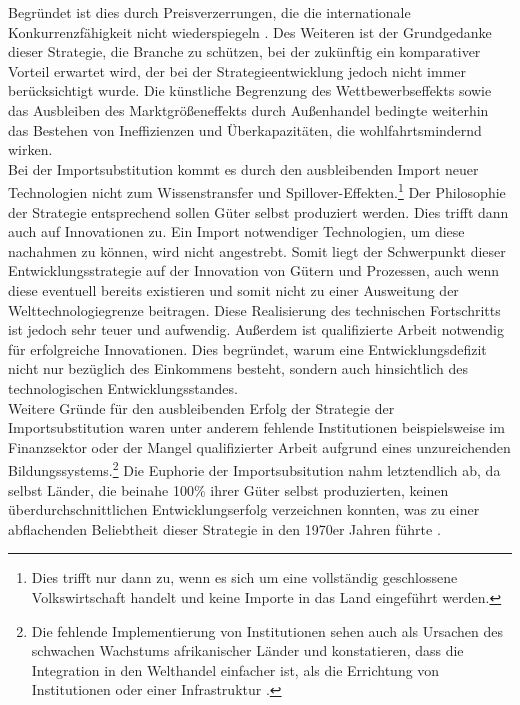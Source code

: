 Begr{\"u}ndet ist dies durch Preisverzerrungen, die die internationale Konkurrenzf{\"a}higkeit nicht wiederspiegeln \citep{Lachmann.1994}. Des Weiteren ist der Grundgedanke dieser Strategie, die Branche zu sch{\"u}tzen, bei der zuk{\"u}nftig ein komparativer Vorteil erwartet wird, der bei der Strategieentwicklung jedoch nicht immer ber{\"u}cksichtigt wurde. Die k{\"u}nstliche Begrenzung des Wettbewerbseffekts sowie das Ausbleiben des Marktgr{\"o}{\ss}eneffekts durch Au{\ss}enhandel bedingte weiterhin das Bestehen von Ineffizienzen und {\"U}berkapazit{\"a}ten, die wohlfahrtsmindernd wirken. \\
Bei der Importsubstitution kommt es durch den ausbleibenden Import neuer Technologien nicht zum Wissenstransfer und Spillover-Effekten.\footnote{Dies trifft nur dann zu, wenn es sich um eine vollst{\"a}ndig geschlossene Volkswirtschaft handelt und keine Importe in das Land eingef{\"u}hrt werden.} Der Philosophie der Strategie entsprechend sollen G{\"u}ter selbst produziert werden. Dies trifft dann auch auf Innovationen zu. Ein Import notwendiger Technologien, um diese nachahmen zu k{\"o}nnen, wird nicht angestrebt. Somit liegt der Schwerpunkt dieser Entwicklungsstrategie auf der Innovation von G{\"u}tern und Prozessen, auch wenn diese eventuell bereits existieren und somit nicht zu einer Ausweitung der Welttechnologiegrenze beitragen. Diese Realisierung des technischen Fortschritts ist jedoch sehr teuer und aufwendig. Au{\ss}erdem ist qualifizierte Arbeit notwendig f{\"u}r erfolgreiche Innovationen. Dies begr{\"u}ndet, warum eine Entwicklungsdefizit nicht nur bez{\"u}glich des Einkommens besteht, sondern auch hinsichtlich des technologischen Entwicklungsstandes.\\
Weitere Gr{\"u}nde f{\"u}r den ausbleibenden Erfolg der Strategie der Importsubstitution waren unter anderem fehlende Institutionen beispielsweise im Finanzsektor oder der Mangel qualifizierter Arbeit aufgrund eines unzureichenden Bildungssystems.\footnote{Die fehlende Implementierung von Institutionen sehen auch \citet{Collier.1999} als Ursachen des schwachen Wachstums afrikanischer L{\"a}nder und konstatieren, dass die Integration in den Welthandel einfacher ist, als die Errichtung von Institutionen oder einer Infrastruktur \cite{Collier.1999}.}\newline 
Die Euphorie der Importsubsitution nahm letztendlich ab, da selbst L{\"a}nder, die beinahe 100{\%} ihrer G{\"u}ter selbst produzierten, keinen {\"u}berdurchschnittlichen Entwicklungserfolg verzeichnen konnten, was zu einer abflachenden Beliebtheit dieser Strategie in den 1970er Jahren f{\"u}hrte \cite{LittleIanMalcolmDavid.1970}.\\
